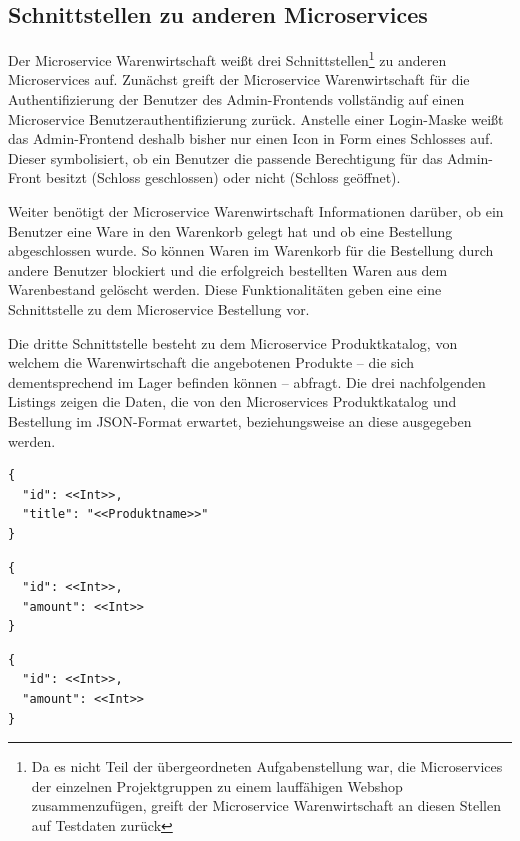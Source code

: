 \subsection{Schnittstellen zu anderen Microservices}
\label{subsec: Schnittstellen zu anderen Microservices}
Der Microservice Warenwirtschaft weißt drei Schnittstellen\footnote{Da es nicht Teil der übergeordneten Aufgabenstellung war, die Microservices der einzelnen Projektgruppen zu einem lauffähigen Webshop zusammenzufügen, greift der Microservice Warenwirtschaft an diesen Stellen auf Testdaten zurück} zu anderen Microservices auf. Zunächst greift der Microservice Warenwirtschaft für die Authentifizierung der Benutzer des Admin-Frontends vollständig auf einen Microservice Benutzerauthentifizierung zurück. Anstelle einer Login-Maske weißt das Admin-Frontend deshalb bisher nur einen Icon in Form eines Schlosses auf. Dieser symbolisiert, ob ein Benutzer die passende Berechtigung für das Admin-Front besitzt (Schloss geschlossen) oder nicht (Schloss geöffnet). \par
Weiter benötigt der Microservice Warenwirtschaft Informationen darüber, ob ein Benutzer eine Ware in den Warenkorb gelegt hat und ob eine Bestellung abgeschlossen wurde. So können Waren im Warenkorb für die Bestellung durch andere Benutzer blockiert und die erfolgreich bestellten Waren aus dem Warenbestand gelöscht werden. Diese Funktionalitäten geben eine eine Schnittstelle zu dem Microservice Bestellung vor. \par 
Die dritte Schnittstelle besteht zu dem Microservice Produktkatalog, von welchem die Warenwirtschaft die angebotenen Produkte -- die sich dementsprechend im Lager befinden können -- abfragt. Die drei nachfolgenden Listings zeigen die Daten, die von den  Microservices Produktkatalog und Bestellung im JSON-Format erwartet, beziehungsweise an diese ausgegeben werden. 

\begin{lstlisting}[caption=Datenabfrage aus dem Produktkatalog]
{
  "id": <<Int>>,
  "title": "<<Produktname>>"
}
\end{lstlisting}


\begin{lstlisting}[caption=Datenabfrage von der Bestellung (Waren im Warenkorb abgelegt)]
{
  "id": <<Int>>,
  "amount": <<Int>>
}
\end{lstlisting}



\begin{lstlisting}[caption=Datenabfrage von der Bestellung (Waren wurden bestellt)]
{
  "id": <<Int>>,
  "amount": <<Int>>
}
\end{lstlisting}



